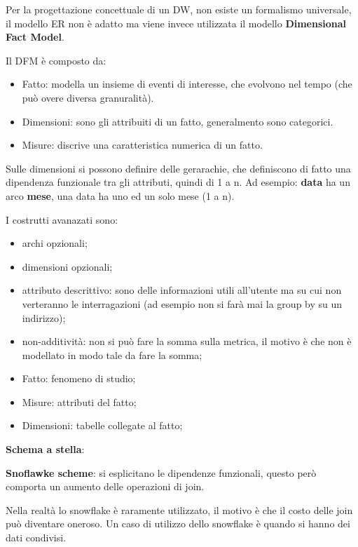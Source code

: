 \documentclass[12pt]{article}
\begin{document}
Per la progettazione concettuale di un DW, non esiste un formalismo universale, il modello ER non \`e adatto ma viene invece utilizzata il modello \textbf{Dimensional Fact Model}.

Il DFM \`e composto da:
\begin{itemize}
    \item Fatto: modella un insieme di eventi di interesse, che evolvono nel tempo (che pu\`o overe diversa granuralit\`a).
    \item Dimensioni: sono gli attribuiti di un fatto, generalmento sono categorici.
    \item Misure: discrive una caratteristica numerica di un fatto.
\end{itemize}
Sulle dimensioni si possono definire delle gerarachie, che definiscono di fatto una dipendenza funzionale tra gli attributi, quindi di 1 a n. Ad esempio: \textbf{data} ha un arco \textbf{mese}, una data ha uno ed un solo mese (1 a n).

I costrutti avanazati sono:
\begin{itemize}
    \item archi opzionali;
    \item dimensioni opzionali;
    \item attributo descrittivo: sono delle informazioni utili all'utente ma su cui non verteranno le interragazioni (ad esempio non si far\`a mai la group by su un indirizzo);
    \item non-additivit\`a: non si pu\`o fare la somma sulla metrica, il motivo \`e che non \`e modellato in modo tale da fare la somma;
\end{itemize}




\begin{itemize}
    \item Fatto: fenomeno di studio;
    \item Misure: attributi del fatto;
    \item Dimensioni: tabelle collegate al fatto;
\end{itemize}


\textbf{Schema a stella}:


\textbf{Snoflawke scheme}: si esplicitano le dipendenze funzionali, questo per\`o comporta un aumento delle operazioni di join.

Nella realt\`a lo snowflake \`e raramente utilizzato, il motivo \`e che il costo delle join pu\`o diventare oneroso. Un caso di utilizzo dello snowflake \`e quando si hanno dei dati condivisi.
\end{document}
